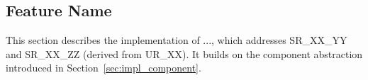 \subsection{Feature Name}
\label{sec:impl_feature_name}


This section describes the implementation of ..., which addresses
SR\_XX\_YY and SR\_XX\_ZZ (derived from UR\_XX).
It builds on the component abstraction introduced in 
Section~\ref{sec:impl_component}.



